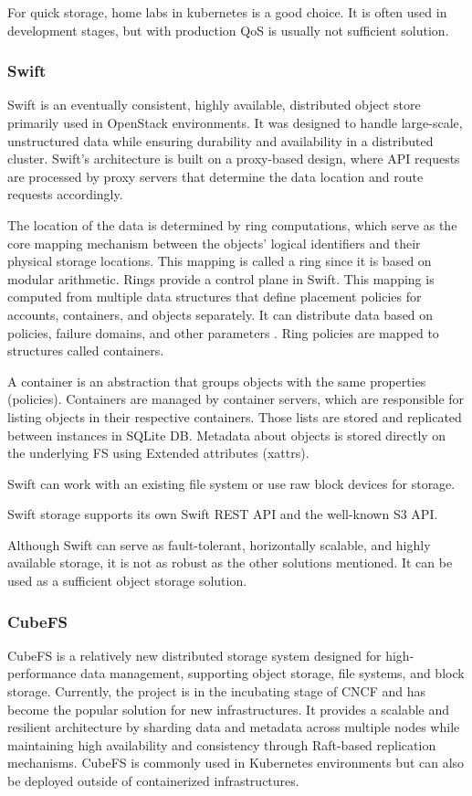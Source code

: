 \vspace{1.5em} %
For quick storage, home labs in kubernetes is a good choice. It is often used in development stages, but with production QoS is usually not sufficient solution.

\subsubsection{Swift}
Swift is an eventually consistent, highly available, distributed object store primarily used in OpenStack environments. It was designed to handle large-scale, unstructured data while ensuring durability and availability in a distributed cluster. Swift’s architecture is built on a proxy-based design, where API requests are processed by proxy servers that determine the data location and route requests accordingly.

The location of the data is determined by ring computations, which serve as the core mapping mechanism between the objects' logical identifiers and their physical storage locations. This mapping is called a ring since it is based on modular arithmetic. Rings provide a control plane in Swift. This mapping is computed from multiple data structures that define placement policies for accounts, containers, and objects separately. It can distribute data based on policies, failure domains, and other parameters \cite{flament_openstack_2014}. Ring policies are mapped to structures called containers.

A container is an abstraction that groups objects with the same properties (policies). Containers are managed by container servers, which are responsible for listing objects in their respective containers. Those lists are stored and replicated between instances in SQLite DB. Metadata about objects is stored directly on the underlying FS using Extended attributes (xattrs).

Swift can work with an existing file system or use raw block devices for storage. 

Swift storage supports its own Swift REST API and the well-known S3 API. \cite{team_swift_2024}

\vspace{1.5em} %
Although Swift can serve as fault-tolerant, horizontally scalable, and highly available storage, it is not as robust as the other solutions mentioned. It can be used as a sufficient object storage solution. \cite{team_swift_2024}
\subsubsection{CubeFS}\label{sec:cubefs} %
CubeFS is a relatively new distributed storage system designed for high-performance data management, supporting object storage, file systems, and block storage. Currently, the project is in the incubating stage of CNCF and has become the popular solution for new infrastructures. It provides a scalable and resilient architecture by sharding data and metadata across multiple nodes while maintaining high availability and consistency through Raft-based replication mechanisms. CubeFS is commonly used in Kubernetes environments but can also be deployed outside of containerized infrastructures.

